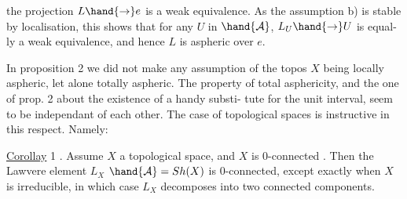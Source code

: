 the projection $L \hand{\to} e$ is a weak equivalence.  As the assumption b) is stable
 by localisation, this shows that for any $U$ in $\hand{\mathcal{A}}$, $L_U \hand{\to} U$ is equal-%
ly a weak equivalence,  and hence $L$ is aspheric over $e$.

In proposition 2 we did not make any assumption of the topos $X$ being
locally aspheric,  let alone totally aspheric.  The  property of total
asphericity,  and the one of prop. 2 about the existence of a handy substi-%
tute for the unit interval,  seem to be independant of each other. The case
of topological spaces is instructive in this respect. Namely:

\uline{Corollay} 1 .  Assume $X$  a topological space,  and $X$ is $0$-connected .
Then the Lawvere element  $L_X$  $\hand{\mathcal{A}}= Sh(X)$  is  $0$-connected,  except exactly
when $X$ is irreducible,  in which case $L_X$ decomposes into two connected
components.

